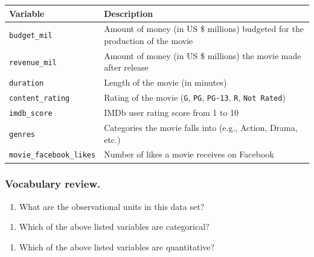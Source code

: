 \documentclass[
]{report}
\providecommand{\tightlist}{%
  \setlength{\itemsep}{0pt}\setlength{\parskip}{0pt}}
\begin{document}
\begin{longtable}[]{@{}
  >{\raggedright\arraybackslash}p{}
  >{\raggedright\arraybackslash}p{}@{}}
\toprule
\textbf{Variable} & \textbf{Description} \\
\midrule
\endhead
\texttt{budget\_mil} & Amount of money (in US \$ millions) budgeted for the production of the movie \\
\texttt{revenue\_mil} & Amount of money (in US \$ millions) the movie made after release \\
\texttt{duration} & Length of the movie (in minutes) \\
\texttt{content\_rating} & Rating of the movie (\texttt{G}, \texttt{PG}, \texttt{PG-13}, \texttt{R}, \texttt{Not\ Rated}) \\
\texttt{imdb\_score} & IMDb user rating score from 1 to 10 \\
\texttt{genres} & Categories the movie falls into (e.g., Action, Drama, etc.) \\
\texttt{movie\_facebook\_likes} & Number of likes a movie receives on Facebook \\
\bottomrule
\end{longtable}

\newpage

\hypertarget{vocabulary-review.}{%
\subsubsection{Vocabulary review.}\label{vocabulary-review.}}

\begin{enumerate}
\def\labelenumi{\arabic{enumi}.}
\tightlist
\item
  What are the observational units in this data set?
\end{enumerate}

\vspace{0.1in}

\begin{enumerate}
\def\labelenumi{\arabic{enumi}.}
\setcounter{enumi}{1}
\tightlist
\item
  Which of the above listed variables are categorical?
\end{enumerate}

\vspace{.5in}

\begin{enumerate}
\def\labelenumi{\arabic{enumi}.}
\setcounter{enumi}{2}
\tightlist
\item
  Which of the above listed variables are quantitative?
\end{enumerate}
\end{document}
